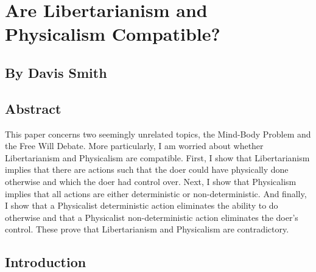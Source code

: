 \chapter{Are Libertarianism and Physicalism Compatible?}
\section{By Davis Smith}
\section{Abstract}

This paper concerns two seemingly unrelated topics, the Mind-Body Problem and the Free Will Debate. More particularly, I am worried about whether Libertarianism and Physicalism are compatible. First, I show that Libertarianism implies that there are actions such that the doer could have physically done otherwise and which the doer had control over. Next, I show that Physicalism implies that all actions are either deterministic or non-deterministic. And finally, I show that a Physicalist deterministic action eliminates the ability to do otherwise and that a Physicalist non-deterministic action eliminates the doer’s control. These prove that Libertarianism and Physicalism are contradictory.
\section{Introduction}

